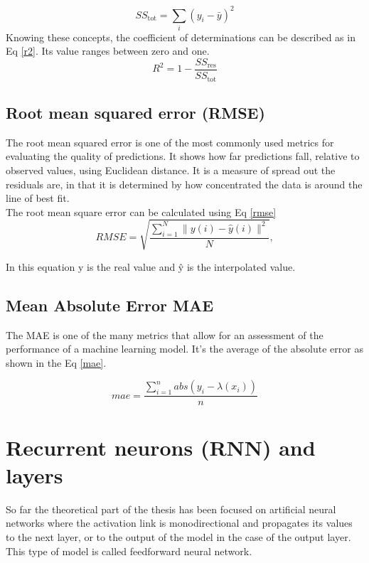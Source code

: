 \begin{equation}
S S_{\mathrm{tot}}=\sum_{i}\left(y_{i}-\bar{y}\right)^{2}
\label{sstot}
\end{equation}
Knowing these concepts, the coefficient of determinations can be described as in Eq \eqref{r2}. Its value ranges between zero and one.
\begin{equation}
R^{2}=1-\frac{S S_{\mathrm{res}}}{S S_{\mathrm{tot}}}
\label{r2}
\end{equation}

\subsection{Root mean squared error (RMSE)}
The root mean squared error \autocite{RossStat} is one of the most commonly used metrics for evaluating the quality of predictions. It shows how far predictions fall, relative to observed values, using Euclidean distance. It is a measure of spread out the residuals are, in that it is determined by how concentrated the data is around the line of best fit.
\\The root mean square error can be calculated using Eq \eqref{rmse}
\begin{equation}
R M S E=\sqrt{\frac{\sum_{i=1}^{N}\|y(i)-\hat{y}(i)\|^{2}}{N}},
\label{rmse}
\end{equation}

In this equation y is the real value and ŷ  is the interpolated value.

\subsection{Mean Absolute Error MAE}
The MAE is one of the many metrics that allow for an assessment of the performance  of a machine learning model. It’s the average of the absolute error as shown in the Eq \eqref{mae}.

\begin{equation}
m a e=\frac{\sum_{i=1}^{n} a b s\left(y_{i}-\lambda\left(x_{i}\right)\right)}{n}
\label{mae}
\end{equation}

\clearpage

\section{Recurrent neurons (RNN) and layers}
So far the theoretical part of the thesis has been focused on artificial neural networks where the activation link is monodirectional and propagates its values to the next layer, or to the output of the model in the case of the output layer. This type of model is called feedforward neural network.

